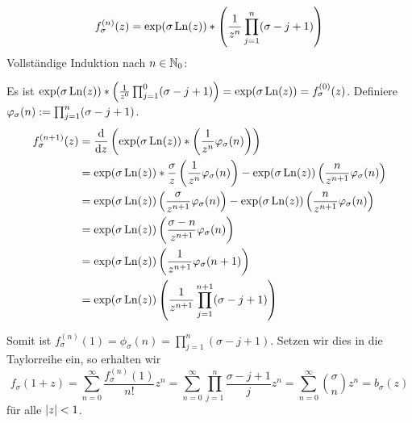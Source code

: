 \begin{exercisePage}
\begin{enumerate}[label=(zu \alph*), leftmargin=*]
\begin{equation*}
			f_\sigma^{(n)}(z) = \exp(\sigma \operatorname{Ln}(z)) * \left( \frac{1}{z^{n}} \prod_{j=1}^n (\sigma - j + 1) \right)
		\end{equation*} 
		Vollständige Induktion nach $n \in \mathbb{N}_0$:
		\begin{induction}
			\ianfang[$n=0$] Es ist $\exp(\sigma \operatorname{Ln}(z)) * \left( \frac{1}{z^0} \prod_{j=1}^0 (\sigma - j + 1) \right) = \exp(\sigma \operatorname{Ln}(z)) = f_\sigma^{(0)}(z)$.
			\ischritt Definiere $\varphi_\sigma(n) \mathrel{:=} \prod_{j=1}^n (\sigma - j + 1)$.
			\begin{align*}
				f_\sigma^{(n+1)}(z) 
				&= \frac{\mathrm{d}}{\mathrm{d} z } \left( \exp(\sigma \operatorname{Ln}(z)) * \left( \frac{1}{z^{n}} \varphi_\sigma(n) \right) \right) \\
				&= \exp(\sigma \operatorname{Ln}(z)) * \frac{\sigma}{z} \left( \frac{1}{z^{n}} \varphi_\sigma(n) \right) - \exp(\sigma \operatorname{Ln}(z)) \left( \frac{n}{z^{n+1}} \varphi_\sigma(n) \right) \\
				&= \exp(\sigma \operatorname{Ln}(z)) \left( \frac{\sigma}{z^{n+1}} \varphi_\sigma(n) \right) - \exp(\sigma \operatorname{Ln}(z)) \left( \frac{n}{z^{n+1}} \varphi_\sigma(n) \right) \\
				&= \exp(\sigma \operatorname{Ln}(z)) \left( \frac{\sigma-n}{z^{n+1}} \varphi_\sigma(n) \right) \\
				&= \exp(\sigma \operatorname{Ln}(z)) \left( \frac{1}{z^{n+1}} \varphi_\sigma(n+1) \right) \\
				&= \exp(\sigma \operatorname{Ln}(z)) \left( \frac{1}{z^{n+1}} \prod_{j=1}^{n+1} (\sigma - j + 1) \right)
			\end{align*}
		\end{induction}
		Somit ist $f_\sigma^{(n)}(1) = \phi_\sigma(n) = \prod_{j=1}^n (\sigma - j + 1)$.
		Setzen wir dies in die Taylorreihe ein, so erhalten wir
		\begin{equation*}
			f_\sigma(1+z) = \sum_{n=0}^{\infty} \frac{f_\sigma^{(n)}(1)}{n!} z^n = \sum_{n=0}^{\infty} \prod_{j=1}^n \frac{\sigma - j + 1}{j} z^n 
			= \sum_{n=0}^{\infty} \binom{\sigma}{n} z^n 
			= b_\sigma(z)
		\end{equation*}
		für alle $\left| z \right| < 1$.
	\end{enumerate}
\end{exercisePage}
